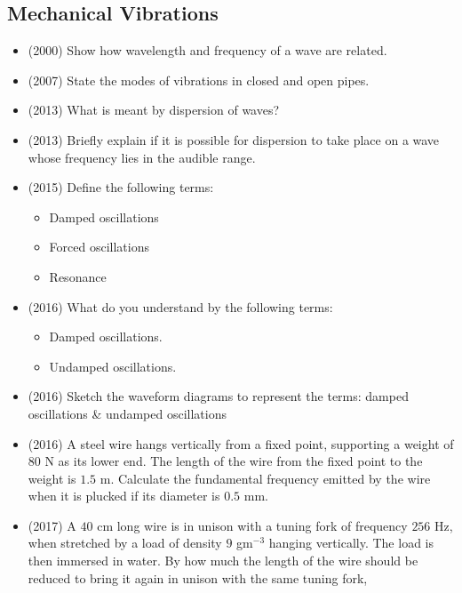 \documentclass{article}
\begin{document}
\subsection{Mechanical Vibrations}
\begin{itemize}
\item (2000)  Show how wavelength and frequency of a wave are related.
\item (2007)  State the modes of vibrations in closed and open pipes.  
\item (2013)  What is meant by dispersion of waves? 
\item (2013)  Briefly explain if it is possible for dispersion to take place on a wave whose frequency lies in the audible range.
\item (2015)  Define the following terms:\begin{itemize}
\item Damped oscillations
\item Forced oscillations
\item Resonance
\end{itemize}
\item (2016)  What do you understand by the following terms: \begin{itemize}
\item Damped oscillations. 
\item Undamped oscillations.
\end{itemize}
\item (2016)  Sketch the waveform diagrams to represent the terms: damped oscillations & undamped oscillations
\item (2016)  A steel wire hangs vertically from a fixed point, supporting a weight of $ 80$ N as its lower end.  The length of the wire from the fixed point to the weight is $ 1.5$ m.  Calculate the fundamental frequency emitted by the wire when it is plucked if its diameter is $ 0.5$ mm. 
\item (2017)  A $ 40$ cm long wire is in unison with a tuning fork of frequency $ 256$ Hz, when stretched by a load of density $ 9$ gm$ ^{-3}$ hanging vertically. The load is then immersed in water. By how much the length of the wire should be reduced to bring it again in unison with the same tuning fork,
\end{itemize}
\end{document}
